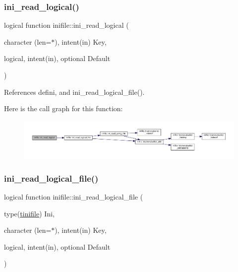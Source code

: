 \subsubsection{\texorpdfstring{ini\+\_\+read\+\_\+logical()}{ini\_read\_logical()}}
{\footnotesize\ttfamily logical function inifile\+::ini\+\_\+read\+\_\+logical (\begin{DoxyParamCaption}\item[{character (len=$\ast$), intent(in)}]{Key,  }\item[{logical, intent(in), optional}]{Default }\end{DoxyParamCaption})}



References defini, and ini\+\_\+read\+\_\+logical\+\_\+file().

Here is the call graph for this function\+:
\nopagebreak
\begin{figure}[H]
\begin{center}
\leavevmode
\includegraphics[width=350pt]{namespaceinifile_aaca241da4d51d99116aa6986a2fa9a49_cgraph}
\end{center}
\end{figure}
\mbox{\label{namespaceinifile_aa28324391b14e57e0c2a11866bda19f6}} 
\subsubsection{\texorpdfstring{ini\+\_\+read\+\_\+logical\+\_\+file()}{ini\_read\_logical\_file()}}
{\footnotesize\ttfamily logical function inifile\+::ini\+\_\+read\+\_\+logical\+\_\+file (\begin{DoxyParamCaption}\item[{type(\mbox{\hyperlink{structinifile_1_1tinifile}{tinifile}})}]{Ini,  }\item[{character (len=$\ast$), intent(in)}]{Key,  }\item[{logical, intent(in), optional}]{Default }\end{DoxyParamCaption})}



